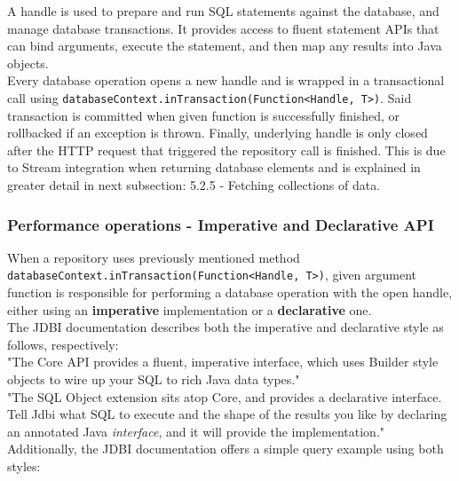 A handle is used to prepare and run SQL statements against the database, and manage database transactions.
It provides access to fluent statement APIs that can bind arguments, execute the statement, and then map any results into Java objects.\\

Every database operation opens a new handle and is wrapped in a transactional call using \texttt{databaseContext.inTransaction(Function<Handle, T>)}.
Said transaction is committed when given function is successfully finished, or rollbacked if an exception is thrown. Finally, underlying handle
is only closed after the HTTP request that triggered the repository call is finished. This is due to Stream integration when returning database
elements and is explained in greater detail in next subsection: 5.2.5 - Fetching collections of data.

\subsubsection{Performance operations - Imperative and Declarative API}

When a repository uses previously mentioned method\\
\texttt{databaseContext.inTransaction(Function<Handle, T>)}, given argument function is responsible
for performing a database operation with the open handle, either using an \textbf{imperative} implementation or a \textbf{declarative} one.\\

The JDBI documentation describes both the imperative and declarative style as follows, respectively:\\

"The Core API provides a fluent, imperative interface, which uses Builder style objects to wire up your SQL to rich Java data types."\\

"The SQL Object extension sits atop Core, and provides a declarative interface. Tell Jdbi what SQL to execute and the shape of the results
you like by declaring an annotated Java \textit{interface}, and it will provide the implementation."\\

Additionally, the JDBI documentation offers a simple query example using both styles:\\

